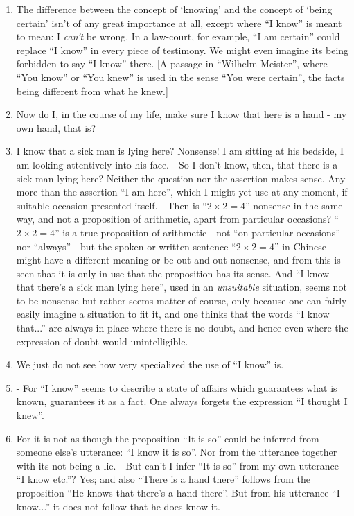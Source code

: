 \documentclass{book}
\begin{document}
\begin{enumerate}
\item
The difference between the concept of `knowing' and the concept of `being
certain' isn't of any great importance at all, except where ``I know'' is meant
to mean: I \emph{can't} be wrong. In a law-court, for example, ``I am certain''
could replace ``I know'' in every piece of testimony. We might even imagine its
being forbidden to say ``I know'' there. {[}A passage in ``Wilhelm Meister'',
where ``You know'' or ``You knew'' is used in the sense ``You were certain'',
the facts being different from what he knew.{]}

\item
Now do I, in the course of my life, make sure I know that here is a hand - my
own hand, that is?

\item
I know that a sick man is lying here? Nonsense! I am sitting at his bedside, I
am looking attentively into his face. - So I don't know, then, that there is a
sick man lying here? Neither the question nor the assertion makes sense. Any
more than the assertion ``I am here'', which I might yet use at any moment, if
suitable occasion presented itself. - Then is ``$2{\times}2=4$'' nonsense in
the same way, and not a proposition of arithmetic, apart from particular
occasions?  ``$2{\times}2=4$'' is a true proposition of arithmetic - not ``on
particular occasions'' nor ``always'' - but the spoken or written sentence
``$2{\times}2=4$'' in Chinese might have a different meaning or be out and out
nonsense, and from this is seen that it is only in use that the proposition has
its sense. And ``I know that there's a sick man lying here'', used in an
\emph{unsuitable} situation, seems not to be nonsense but rather seems
matter-of-course, only because one can fairly easily imagine a situation to fit
it, and one thinks that the words ``I know that...'' are always in place where
there is no doubt, and hence even where the expression of doubt would
unintelligible.

\item
We just do not see how very specialized the use of ``I know'' is.

\item
- For ``I know'' seems to describe a state of affairs which guarantees what is
known, guarantees it as a fact. One always forgets the expression ``I thought I
knew''.

\item
For it is not as though the proposition ``It is so'' could be inferred from
someone else's utterance: ``I know it is so''. Nor from the utterance together
with its not being a lie. - But can't I infer ``It is so'' from my own
utterance ``I know etc.''? Yes; and also ``There is a hand there'' follows from
the proposition ``He knows that there's a hand there''. But from his utterance
``I know...'' it does not follow that he does know it.


\end{enumerate}
\end{document}
